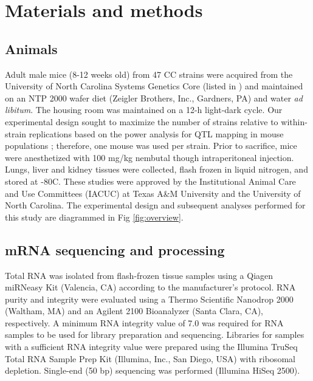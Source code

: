 \documentclass[10pt,letterpaper]{article}
\begin{document}
\section*{Materials and methods}

\subsection*{Animals}

Adult male mice (8-12 weeks old) from 47 CC strains were acquired from the University of North Carolina Systems Genetics Core (listed in ) and maintained on an NTP 2000 wafer diet (Zeigler Brothers, Inc., Gardners, PA) and water \textit{ad libitum}. The housing room was maintained on a 12-h light-dark cycle. Our experimental design sought to maximize the number of strains relative to within-strain replications based on the power analysis for QTL mapping in mouse populations \cite{Kaeppler1997}; therefore, one mouse was used per strain. Prior to sacrifice, mice were anesthetized with 100 mg/kg nembutal though intraperitoneal injection. Lungs, liver and kidney tissues were collected, flash frozen in liquid nitrogen, and stored at -80\degree C. These studies were approved by the Institutional Animal Care and Use Committees (IACUC) at Texas A\&M University and the University of North Carolina. The experimental design and subsequent analyses performed for this study are diagrammed in Fig \ref{fig:overview}.


\subsection*{mRNA sequencing and processing}

Total RNA was isolated from flash-frozen tissue samples using a Qiagen miRNeasy Kit (Valencia, CA) according to the manufacturer’s protocol. RNA purity and integrity were evaluated using a Thermo Scientific Nanodrop 2000 (Waltham, MA) and an Agilent 2100 Bioanalyzer (Santa Clara, CA), respectively. A minimum RNA integrity value of 7.0 was required for RNA samples to be used for library preparation and sequencing. Libraries for samples with a sufficient RNA integrity value were prepared using the Illumina TruSeq Total RNA Sample Prep Kit (Illumina, Inc., San Diego, USA) with ribosomal depletion. Single-end (50 bp) sequencing was performed (Illumina HiSeq 2500).
\end{document}
